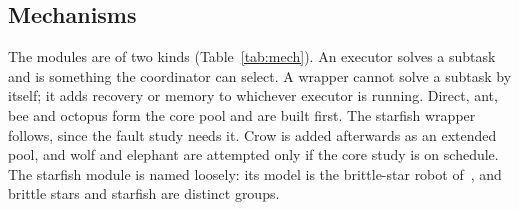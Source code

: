 \documentclass[11pt,a4paper]{article}
\begin{document}
\subsection{Mechanisms}
\label{sec:mech}

The modules are of two kinds (Table~\ref{tab:mech}). An executor solves a subtask and is something the
coordinator can select. A wrapper cannot solve a subtask by itself; it adds recovery or memory to whichever
executor is running. Direct, ant, bee and octopus form the core pool and are built first. The starfish
wrapper follows, since the fault study needs it. Crow is added afterwards as an extended pool, and wolf and
elephant are attempted only if the core study is on schedule. The starfish module is named loosely: its
model is the brittle-star robot of~\cite{kano2017}, and brittle stars and starfish are distinct groups.
\end{document}
